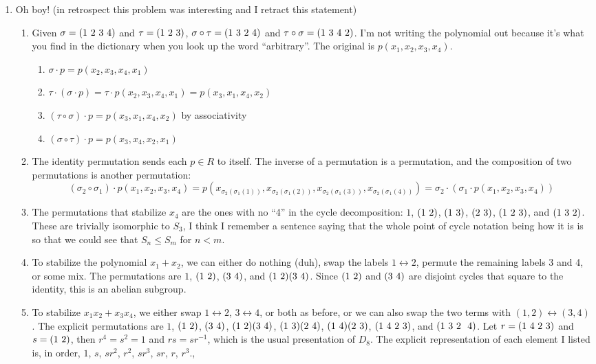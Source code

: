 \documentclass[]{article}
\newcommand*{\cycle}[1]{( \foreach \entry [count=\i] in {#1} {\ifnum\i>1\ \fi\entry})}
\begin{document}
\begin{enumerate}
\item Oh boy! (in retrospect this problem was interesting and I retract this statement)
\begin{enumerate}
\item Given $\sigma = \cycle{1,2,3,4}$ and $\tau = \cycle{1,2,3}$, $\sigma\circ\tau = \cycle{1,3,2,4}$ and $\tau\circ\sigma = \cycle{1,3,4,2}$. I'm not writing the polynomial out because it's what you find in the dictionary when you look up the word ``arbitrary''. The original is $p(x_1,x_2,x_3,x_4)$.
\begin{enumerate}
\item $\sigma\cdot p = p(x_2,x_3,x_4,x_1)$
\item $\tau\cdot (\sigma\cdot p) = \tau\cdot p(x_2,x_3,x_4,x_1) = p(x_3,x_1,x_4,x_2)$
\item $(\tau\circ\sigma)\cdot p = p(x_3,x_1,x_4,x_2)$ by associativity
\item $(\sigma\circ\tau)\cdot p = p(x_3,x_4,x_2,x_1)$
\end{enumerate}

\item The identity permutation sends each $p\in R$ to itself. The inverse of a permutation is a permutation, and the composition of two permutations is another permutation:
\begin{equation}
(\sigma_2 \circ \sigma_1)\cdot p(x_1,x_2,x_3,x_4) = p(x_{\sigma_2(\sigma_1(1))}, x_{\sigma_2(\sigma_1(2))}, x_{\sigma_2(\sigma_1(3))}, x_{\sigma_2(\sigma_1(4))}) = \sigma_2\cdot (\sigma_1\cdot p(x_1,x_2,x_3,x_4))
\end{equation}

\item The permutations that stabilize $x_4$ are the ones with no ``4'' in the cycle decomposition: $1$, $\cycle{1,2}$, $\cycle{1,3}$, $\cycle{2,3}$, $\cycle{1,2,3}$, and $\cycle{1,3,2}$. These are trivially isomorphic to $S_3$, I think I remember a sentence saying that the whole point of cycle notation being how it is is so that we could see that $S_n \leq S_m$ for $n < m$.

\item To stabilize the polynomial $x_1 + x_2$, we can either do nothing (duh), swap the labels $1 \leftrightarrow 2$, permute the remaining labels 3 and 4, or some mix. The permutations are $1$, $\cycle{1,2}$, $\cycle{3,4}$, and $\cycle{1,2}\cycle{3,4}$. Since $\cycle{1,2}$ and $\cycle{3,4}$ are disjoint cycles that square to the identity, this is an abelian subgroup.

\item To stabilize $x_1 x_2 + x_3 x_4$, we either swap $1 \leftrightarrow 2$, $3 \leftrightarrow 4$, or both as before, or we can also swap the two terms with $(1,2) \leftrightarrow (3,4)$. The explicit permutations are $1$, $\cycle{1,2}$, $\cycle{3,4}$, $\cycle{1,2}\cycle{3,4}$, $\cycle{1,3}\cycle{2,4}$, $\cycle{1,4}\cycle{2,3}$, $\cycle{1,4,2,3}$, and $\cycle{1,3,2,,4}$. Let $r = \cycle{1,4,2,3}$ and $s = \cycle{1,2}$, then $r^4 = s^2 = 1$ and $rs = sr^{-1}$, which is the usual presentation of $D_8$. The explicit representation of each element I listed is, in order, $1$, $s$, $sr^2$, $r^2$, $sr^3$, $sr$, $r$, $r^3$.,


\end{enumerate}
\end{enumerate}
\end{document}
